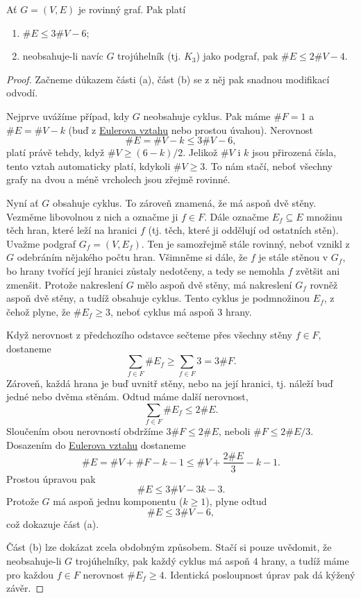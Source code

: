 \begin{lemma}
 \label{lem:hrany-rovinnych-grafu}
 Ať $G = (V,E)$ je rovinný graf. Pak platí
 \begin{enumerate}[label=(\alph*)]
  \item $\# E \leq 3\# V - 6$;
  \item neobsahuje-li navíc $G$ trojúhelník (tj. $K_3$) jako podgraf, pak $\#
   E \leq 2\# V - 4$.
 \end{enumerate}
\end{lemma}
\begin{proof}
 Začneme důkazem části (a), část (b) se z něj pak snadnou modifikací odvodí.

 Nejprve uvážíme případ, kdy $G$ neobsahuje cyklus. Pak máme $\# F = 1$ a $\# E
 = \# V - k$ (buď z \hyperref[claim:euleruv-vztah]{Eulerova vztahu} nebo prostou
 úvahou). Nerovnost
 \[
  \# E = \# V - k \leq 3\# V - 6,
 \]
 platí právě tehdy, když $\# V \geq (6-k) / 2$. Jelikož $\# V$ i $k$ jsou
 přirozená čísla, tento vztah automaticky platí, kdykoli $\# V \geq 3$. To nám
 stačí, neboť všechny grafy na dvou a méně vrcholech jsou zřejmě rovinné.

 Nyní ať $G$ obsahuje cyklus. To zároveň znamená, že má aspoň dvě stěny. Vezměme
 libovolnou z nich a označme ji $f \in F$. Dále označme $E_f \subseteq E$
 množinu těch hran, které leží na hranici $f$ (tj. těch, které ji oddělují od
 ostatních stěn). Uvažme podgraf $G_f = (V,E_f)$. Ten je samozřejmě stále
 rovinný, neboť vznikl z $G$ odebráním nějakého počtu hran. Všimněme si dále, že
 $f$ je stále stěnou v $G_f$, bo hrany tvořící její hranici zůstaly nedotčeny, a
 tedy se nemohla $f$ zvětšit ani zmenšit. Protože nakreslení $G$ mělo aspoň dvě
 stěny, má nakreslení $G_f$ rovněž aspoň dvě stěny, a tudíž obsahuje cyklus.
 Tento cyklus je podmnožinou $E_f$, z čehož plyne, že $\# E_f \geq 3$, neboť
 cyklus má aspoň 3 hrany.

 Když nerovnost z předchozího odstavce sečteme přes všechny stěny $f \in F$,
 dostaneme
 \[
  \sum_{f \in F} \# E_f \geq \sum_{f \in F} 3 = 3 \# F.
 \]
 Zároveň, každá hrana je buď uvnitř stěny, nebo na její hranici, tj. náleží buď
 jedné nebo dvěma stěnám. Odtud máme další nerovnost,
 \[
  \sum_{f \in F} \# E_f \leq 2\# E.
 \]
 Sloučením obou nerovností obdržíme $3\# F \leq 2\# E$, neboli $\# F \leq 2\# E
 / 3$. Dosazením do \hyperref[claim:euleruv-vztah]{Eulerova vztahu} dostaneme
 \[
  \# E = \# V + \# F - k - 1 \leq \# V + \frac{2\# E}{3} - k - 1.
 \]
 Prostou úpravou pak
 \[
  \# E \leq 3\# V - 3k - 3.
 \]
 Protože $G$ má aspoň jednu komponentu ($k \geq 1$), plyne odtud
 \[
  \# E \leq 3\# V - 6,
 \]
 což dokazuje část (a). 

 Část (b) lze dokázat zcela obdobným způsobem. Stačí si pouze uvědomit, že
 neobsahuje-li $G$ trojúhelníky, pak každý cyklus má aspoň 4 hrany, a tudíž máme
 pro každou $f \in F$ nerovnost $\# E_f \geq 4$. Identická posloupnost úprav pak
 dá kýžený závěr.
\end{proof}

